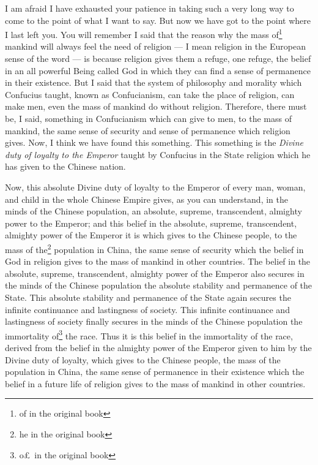 I am afraid I have exhausted your patience in taking such a very long way to come to the point of what I want to say.
But now we have got to the point where I last left you.
You will remember I said that the reason why the mass of\footnote{of in the original book} mankind will always feel the need of religion --- I mean religion in the European sense of the word --- is because religion gives them a refuge, one refuge, the belief in an all powerful Being called God in which they can find a sense of permanence in their existence.
But I said that the system of philosophy and morality which Confucius taught, known as Confucianism, can take the place of religion, can make men, even the mass of mankind do without religion.
Therefore, there must be, I said, something in Confucianism which can give to men, to the mass of mankind, the same sense of security and sense of permanence which religion gives.
Now, I think we have found this something.
This something is the \emph{Divine duty of loyalty to the Emperor} taught by Confucius in the State religion which he has given to the Chinese nation.

Now, this absolute Divine duty of loyalty to the Emperor of every man, woman, and child in the whole Chinese Empire gives, as you can understand, in the minds of the Chinese population, an absolute, supreme, transcendent, almighty power to the Emperor; and this belief in the absolute, supreme, transcendent, almighty power of the Emperor it is which gives to the Chinese people, to the mass of the\footnote{he in the original book} population in China, the same sense of security which the belief in God in religion gives to the mass of mankind in other countries.
The belief in the absolute, supreme, transcendent, almighty power of the Emperor also secures in the minds of the Chinese population the absolute stability and permanence of the State.
This absolute stability and permanence of the State again secures the infinite continuance and lastingness of society.
This infinite continuance and lastingness of society finally secures in the minds of the Chinese population the immortality of\footnote{o\pounds\, in the original book} the race.
Thus it is this belief in the immortality of the race, derived from the belief in the almighty power of the Emperor given to him by the Divine duty of loyalty, which gives to the Chinese people, the mass of the population in China, the same sense of permanence in their existence which the belief in a future life of religion gives to the mass of mankind in other countries.

